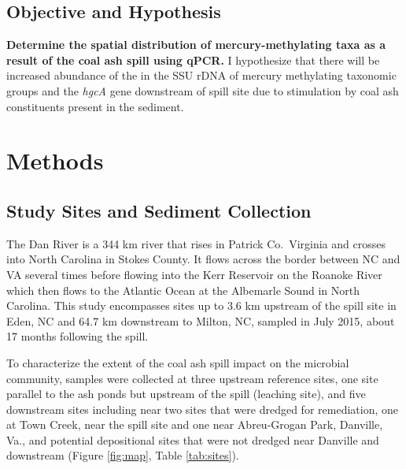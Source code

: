 \documentclass[ms, hidelinks]{uncgdissertationexp3}
\theoremstyle{plain}
\theoremstyle{definition}
\theoremstyle{remark}
\begin{document}
\subsection{Objective and Hypothesis}\label{objective-and-hypothesis}

\textbf{Determine the spatial distribution of mercury-methylating taxa as a result of the coal ash spill using qPCR.}
I hypothesize that there will be increased abundance of the in the SSU rDNA of mercury methylating taxonomic groups and the \emph{hgcA} gene downstream of spill site due to stimulation by coal ash constituents present in the sediment.

\hypertarget{methods}{%
\section{Methods}\label{methods}}

\hypertarget{study-sites-and-sediment-collection}{%
\subsection{Study Sites and Sediment Collection}\label{study-sites-and-sediment-collection}}

The Dan River is a 344 km river that rises in Patrick Co.~Virginia and crosses into North Carolina in Stokes County. It flows across the border between NC and VA several times before flowing into the Kerr Reservoir on the Roanoke River which then flows to the Atlantic Ocean at the Albemarle Sound in North Carolina. This study encompasses sites up to 3.6 km upstream of the spill site in Eden, NC and 64.7 km downstream to Milton, NC, sampled in July 2015, about 17 months following the spill.

To characterize the extent of the coal ash spill impact on the microbial community, samples were collected at three upstream reference sites, one site parallel to the ash ponds but upstream of the spill (leaching site), and five downstream sites including near two sites that were dredged for remediation, one at Town Creek, near the spill site and one near Abreu-Grogan Park, Danville, Va., and potential depositional sites that were not dredged near Danville and downstream (Figure \ref{fig:map}, Table \ref{tab:sites}).
\end{document}
